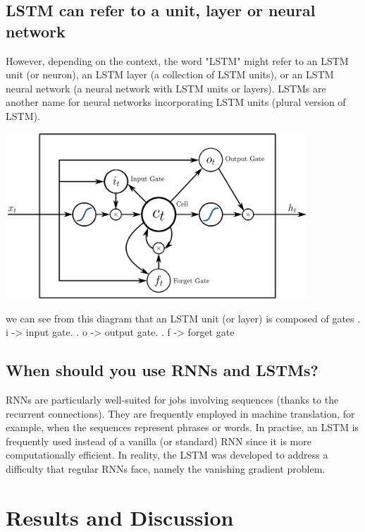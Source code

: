 \documentclass[12pt,a4paper]{article}
\begin{document}
        \subsection{LSTM can refer to a unit, layer or neural network}
        However, depending on the context, the word "LSTM" might refer to an LSTM unit (or neuron), an LSTM layer (a collection of LSTM units), or an LSTM neural network (a neural network with LSTM units or layers).\newline
        LSTMs are another name for neural networks incorporating LSTM units (plural version of LSTM).
        \begin{center}
         \includegraphics[width=320pt]{imgs/lstm.png}
        \end{center}
        we can see from this diagram that an LSTM unit (or layer) is composed of gates . i -> input gate. . o -> output gate. . f -> forget gate
    \subsection{When should you use RNNs and LSTMs?}
    RNNs are particularly well-suited for jobs involving sequences (thanks to the recurrent connections). They are frequently employed in machine translation, for example, when the sequences represent phrases or words. \newline
    In practise, an LSTM is frequently used instead of a vanilla (or standard) RNN since it is more computationally efficient. \newline
    In reality, the LSTM was developed to address a difficulty that regular RNNs face, namely the vanishing gradient problem.
    \newpage

    \section{Results and Discussion}
\end{document}
